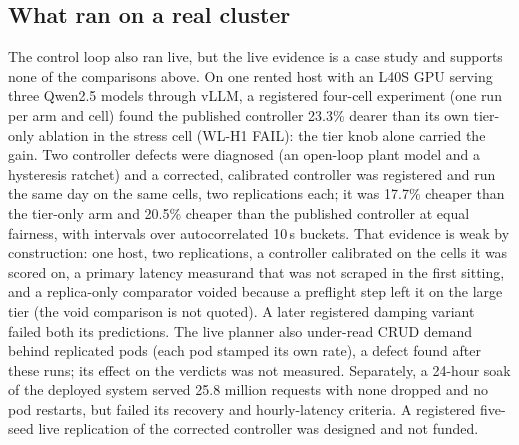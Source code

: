 \subsection{What ran on a real cluster}
\label{sec:live}

The control loop also ran live, but the live evidence is a case study and
supports none of the comparisons above. On one rented host with an L40S GPU
serving three Qwen2.5 models through vLLM, a registered four-cell
experiment (one run per arm and cell) found the published controller 23.3\%
dearer than its own tier-only ablation in the stress cell (WL-H1 FAIL): the
tier knob alone carried the gain. Two controller defects were diagnosed (an
open-loop plant model and a hysteresis ratchet) and a corrected,
calibrated controller was registered and run the same day on the same
cells, two replications each; it was 17.7\% cheaper than the tier-only arm
and 20.5\% cheaper than the published controller at equal fairness, with
intervals over autocorrelated 10\,s buckets. That evidence is weak by
construction: one host, two replications, a controller calibrated on the
cells it was scored on, a primary latency measurand that was not scraped
in the first sitting, and a replica-only comparator voided because a
preflight step left it on the large tier (the void comparison is not
quoted). A later registered damping variant failed both its predictions.
The live planner also under-read CRUD demand behind replicated pods (each
pod stamped its own rate), a defect found after these runs; its effect on
the verdicts was not measured. Separately, a 24-hour soak of the deployed
system served 25.8 million requests with none dropped and no pod restarts,
but failed its recovery and hourly-latency criteria. A registered five-seed
live replication of the corrected controller was designed and not funded.
